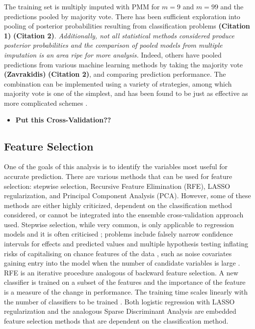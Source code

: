 \documentclass[12pt,]{article}
\providecommand{\tightlist}{%
  \setlength{\itemsep}{0pt}\setlength{\parskip}{0pt}}
\begin{document}
The training set is multiply imputed with PMM for \(m=9\) and \(m=99\)
and the predictions pooled by majority vote. There has been sufficient
exploration into pooling of posterior probabilities resulting from
classification problems \textbf{(Citation 1)} \textbf{(Citation 2)}.
\emph{Additionally, not all statistical methods considered produce
posterior probabilities and the comparison of pooled models from
multiple imputation is an area ripe for more analysis.} Indeed, others
have pooled predictions from various machine learning methods by taking
the majority vote \textbf{(Zavrakidis)} \textbf{(Citation 2)}, and
comparing prediction performance. The combination can be implemented
using a variety of strategies, among which majority vote is one of the
simplest, and has been found to be just as effective as more complicated
schemes \citep{lam_optimal_1995}.

\begin{itemize}
\tightlist
\item
  \textbf{Put this Cross-Validation??}
\end{itemize}

\subsection{Feature Selection}\label{feature-selection}

One of the goals of this analysis is to identify the variables most
useful for accurate prediction. There are various methods that can be
used for feature selection: stepwise selection, Recursive Feature
Elimination (RFE), LASSO regularization, and Principal Component
Analysis (PCA). However, some of these methods are either highly
criticized, dependent on the classification method considered, or cannot
be integrated into the ensemble cross-validation approach used. Stepwise
selection, while very common, is only applicable to regression models
and it is often criticised \citep{kemp_applied_2003}; problems include
falsely narrow confidence intervals for effects and predicted values
\citep{altman_bootstrap_1989} and multiple hypothesis testing inflating
risks of capitalising on chance features of the data
\citep{altman_practical_1991}, such as noise covariates gaining entry
into the model when the number of candidate variables is large
\citep{derksen_backward_1992}. RFE is an iterative procedure analogous
of backward feature selection. A new classifier is trained on a subset
of the features and the importance of the feature is a measure of the
change in performance. The training time scales linearly with the number
of classifiers to be trained \citep{guyon_gene_2002}. Both logistic
regression with LASSO regularization \citep{tibshirani_regression_1996}
and the analogous Sparse Discriminant Analysis
\citep{clemmensen_sparse_2011} are embedded feature selection methods
that are dependent on the classification method.
\end{document}
